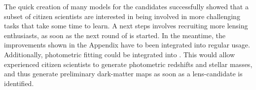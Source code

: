 The quick creation of many models for the {\SW} candidates successfully showed
that a subset of citizen scientists are interested in being involved in more
challenging tasks that take some time to learn. A next steps involves
recruiting more lensing enthusiasts, as soon as the next round of {\SW} is
started.
In the meantime, the improvements shown in the Appendix have to been integrated
into regular {\SpL} usage.
Additionally, photometric fitting could be integrated into {\SpL}.
This would allow experienced citizen scientists to generate photometric
redshifts and stellar masses, and thus generate preliminary dark-matter maps
as soon as a lens-candidate is identified.


